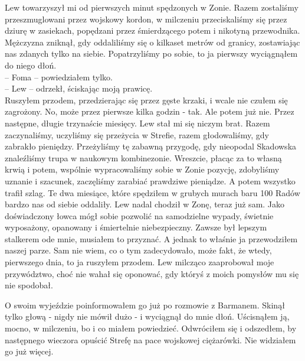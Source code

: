 \documentclass[../MAIN.tex]{subfiles}
\begin{document}
Lew towarzyszył mi od pierwszych minut spędzonych w Zonie.
Razem zostaliśmy przeszmuglowani przez wojskowy kordon, w
milczeniu przeciskaliśmy się przez dziurę w zasiekach,
popędzani przez śmierdzącego potem i nikotyną przewodnika.
Mężczyzna zniknął, gdy oddaliliśmy się o kilkaset metrów od
granicy, zostawiając nas zdanych tylko na siebie. Popatrzyliśmy
po sobie, to ja pierwszy wyciągnąłem do niego dłoń.\\
-- Foma -- powiedziałem tylko.\\
-- Lew -- odrzekł, ściskając moją prawicę.\\
Ruszyłem przodem, przedzierając się przez gęste krzaki, i wcale
nie czułem się zagrożony. No, może przez pierwsze kilka godzin
- tak. Ale potem już nie. Przez następne, długie trzynaście
miesięcy. Lew stał mi się niczym brat. Razem zaczynaliśmy,
uczyliśmy się przeżycia w Strefie, razem głodowaliśmy, gdy
zabrakło pieniędzy. Przeżyliśmy tę zabawną przygodę, gdy
nieopodal Skadowska znaleźliśmy trupa w naukowym kombinezonie.
Wreszcie, płacąc za to własną krwią i potem, wspólnie
wypracowaliśmy sobie w Zonie pozycję, zdobyliśmy uznanie i
szacunek, zaczęliśmy zarabiać prawdziwe pieniądze. A potem
wszystko trafił szlag. Te dwa miesiące, które spędziłem w
grubych murach baru 100 Radów bardzo nas od siebie oddaliły.
Lew nadal chodził w Zonę, teraz już sam. Jako doświadczony
łowca mógł sobie pozwolić na samodzielne wypady, świetnie
wyposażony, opanowany i śmiertelnie niebezpieczny. Zawsze był
lepszym stalkerem ode mnie, musiałem to przyznać. A jednak to
właśnie ja przewodziłem naszej parze. Sam nie wiem, co o tym
zadecydowało, może fakt, że wtedy, pierwszego dnia, to ja
ruszyłem przodem. Lew milcząco zaaprobował moje przywództwo,
choć nie wahał się oponować, gdy któryś z moich pomysłów mu się
nie spodobał.

O swoim wyjeździe poinformowałem go już po rozmowie z Barmanem.
Skinął tylko głową - nigdy nie mówił dużo - i wyciągnął do mnie
dłoń. Uścisnąłem ją, mocno, w milczeniu, bo i co miałem
powiedzieć. Odwróciłem się i odszedłem, by następnego wieczora
opuścić Strefę na pace wojskowej ciężarówki. Nie widziałem go
już więcej.
\end{document}
